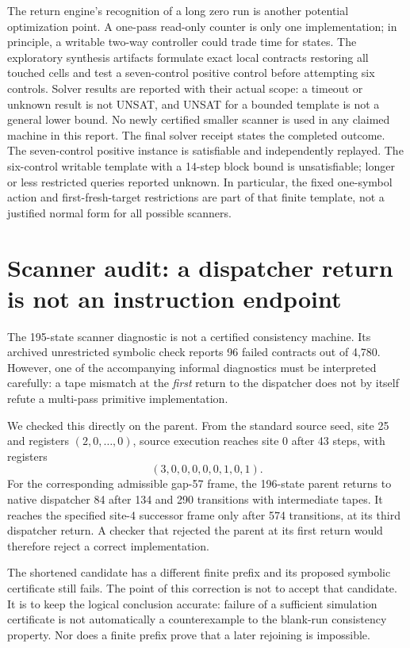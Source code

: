 \documentclass[10pt,letterpaper]{article}
\begin{document}
The return engine's recognition of a long zero run is another potential
optimization point. A one-pass read-only counter is only one implementation;
in principle, a writable two-way controller could trade time for states.
The exploratory synthesis artifacts formulate exact local contracts restoring
all touched cells and test a seven-control positive control before attempting
six controls. Solver results are reported with their actual scope: a timeout
or unknown result is not UNSAT, and UNSAT for a bounded template is not a
general lower bound. No newly certified smaller scanner is used in any claimed
machine in this report. The final solver receipt states the completed outcome.
The seven-control positive instance is satisfiable and independently replayed.
The six-control writable template with a 14-step block bound is unsatisfiable;
longer or less restricted queries reported unknown. In particular, the fixed
one-symbol action and first-fresh-target restrictions are part of that finite
template, not a justified normal form for all possible scanners.



\section{Scanner audit: a dispatcher return is not an instruction endpoint}

The 195-state scanner diagnostic is not a certified consistency machine. Its
archived unrestricted symbolic check reports 96 failed contracts out of 4,780.
However, one of the accompanying informal diagnostics must be interpreted
carefully: a tape mismatch at the \emph{first} return to the dispatcher does
not by itself refute a multi-pass primitive implementation.

We checked this directly on the parent. From the standard source seed,
site 25 and registers $(2,0,\ldots,0)$, source execution reaches site 0 after
43 steps, with registers
\[
 (3,0,0,0,0,0,1,0,1).
\]
For the corresponding admissible gap-57 frame, the 196-state parent returns
to native dispatcher 84 after 134 and 290 transitions with intermediate
tapes. It reaches the specified site-4 successor frame only after 574
transitions, at its third dispatcher return. A checker that rejected the
parent at its first return would therefore reject a correct implementation.

The shortened candidate has a different finite prefix and its proposed
symbolic certificate still fails. The point of this correction is not to
accept that candidate. It is to keep the logical conclusion accurate:
failure of a sufficient simulation certificate is not automatically a
counterexample to the blank-run consistency property. Nor does a finite prefix
prove that a later rejoining is impossible.
\end{document}
